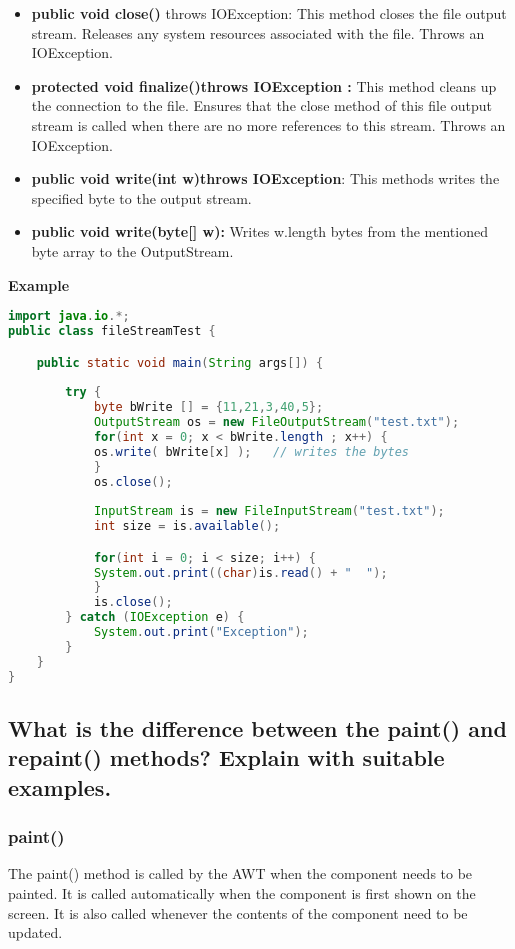 \documentclass[11pt]{article}
\begin{document}
\begin{itemize}
	\item\textbf{public void close()} throws IOException{}: This method closes the file output stream. Releases any system resources associated with the file. Throws an IOException.

	\item\textbf{protected void finalize()throws IOException {}:} This method cleans up the connection to the file. Ensures that the close method of this file output stream is called when there are no more references to this stream. Throws an IOException.

	\item\textbf{public void write(int w)throws IOException{}}: This methods writes the specified byte to the output stream.

	\item\textbf{public void write(byte[] w):} Writes w.length bytes from the mentioned byte array to the OutputStream.
\end{itemize}

\textbf{Example}

\begin{lstlisting}[language=Java]
import java.io.*;
public class fileStreamTest {

	public static void main(String args[]) {
	
		try {
			byte bWrite [] = {11,21,3,40,5};
			OutputStream os = new FileOutputStream("test.txt");
			for(int x = 0; x < bWrite.length ; x++) {
			os.write( bWrite[x] );   // writes the bytes
			}
			os.close();
		
			InputStream is = new FileInputStream("test.txt");
			int size = is.available();

			for(int i = 0; i < size; i++) {
			System.out.print((char)is.read() + "  ");
			}
			is.close();
		} catch (IOException e) {
			System.out.print("Exception");
		}	
	}
}
\end{lstlisting}
\subsection{\textbf{What is the difference between the paint() and repaint() methods? Explain with suitable examples. }}

\subsubsection{paint()}

The paint() method is called by the AWT when the component needs to be painted. It is called automatically when the component is first shown on the screen. It is also called whenever the contents of the component need to be updated.\\
\end{document}
